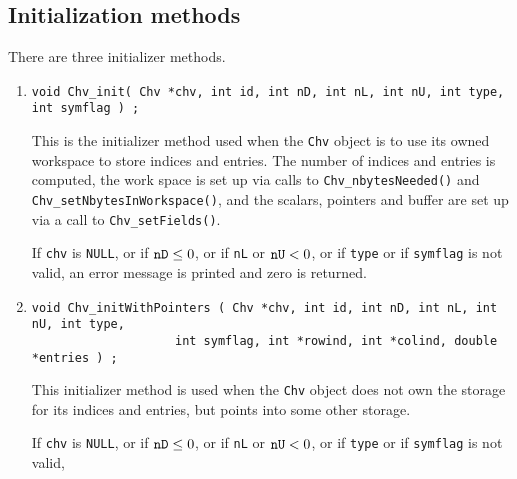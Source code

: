 \subsection{Initialization methods}
\label{subsection:Chv:proto:initial}
\par
There are three initializer methods.
\par
\begin{enumerate}
\item
\begin{verbatim}
void Chv_init( Chv *chv, int id, int nD, int nL, int nU, int type, int symflag ) ;
\end{verbatim}
This is the initializer method used when the {\tt Chv}
object is to use its owned workspace to store indices and entries.
The number of indices and entries is computed,
the work space is set up via calls to {\tt Chv\_nbytesNeeded()}
and {\tt Chv\_setNbytesInWorkspace()},
and the scalars, pointers and buffer are set up via a call to
{\tt Chv\_setFields()}.
\par {}
If {\tt chv} is {\tt NULL},
or if ${\tt nD} \le 0$,
or if {\tt nL} or ${\tt nU} < 0$,
or if {\tt type} or if {\tt symflag} is not valid,
an error message is printed and zero is returned.
\item
\begin{verbatim}
void Chv_initWithPointers ( Chv *chv, int id, int nD, int nL, int nU, int type, 
                    int symflag, int *rowind, int *colind, double *entries ) ;
\end{verbatim}
This initializer method is used when the {\tt Chv}
object does not own the storage for its indices and entries,
but points into some other storage.
\par {}
If {\tt chv} is {\tt NULL},
or if ${\tt nD} \le 0$,
or if {\tt nL} or ${\tt nU} < 0$,
or if {\tt type} or if {\tt symflag} is not valid,

\end{enumerate}
